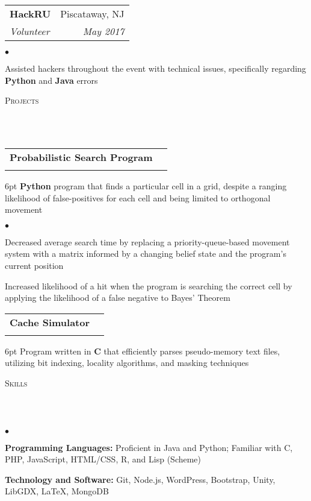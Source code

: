 \documentclass[12pt]{article}
\makeatletter
\newcommand{\lineunder}{
	\vspace*{-8pt} \\ 
	\hspace*{-18pt} 
	\hrulefill \\
}
\newcommand{\header}[1]{
	\vspace*{2pt}
	{\hspace*{-14pt}\vspace*{6pt} \textsc{#1}} 
	\vspace*{-6pt} 
	\lineunder
}
\newenvironment{achievements}{
  \begin{list}{$\bullet$}{
  	\topsep 0pt \itemsep -4pt}}
  	{\vspace*{2pt}\end{list}
}
\newcommand{\subheading}[4]{
 	\vspace{5pt}
    	\begin{tabular*}{1.01\textwidth}{l@{\extracolsep{\fill}}r}
      		\textbf{#1} & #2 \\
      		\textit{\small#3} & \textit{\small #4} \\
    	\end{tabular*}\vspace{-5pt}
}
\makeatother
\begin{document}
\subheading
	{HackRU}{Piscataway, NJ}
	{Volunteer}{May 2017}
	\begin{achievements}
		\item Assisted hackers throughout the event with technical issues, specifically regarding \textbf{Python} and \textbf{Java} errors
	\end{achievements}


\header{Projects}

\subheading{Probabilistic Search Program}{}{}{}
	\vspace{-15pt}	
	\begin{adjustwidth}{6pt}{}
	\textbf{Python} program that finds a particular cell in a grid, despite a ranging likelihood of false-positives for each cell and being limited to orthogonal movement
	\end{adjustwidth}
	\begin{achievements}
		\item Decreased average search time by replacing a priority-queue-based movement system with a matrix informed by a changing belief state and the program's current position
		\item Increased likelihood of a hit when the program is searching the correct cell by applying the likelihood of a false negative to Bayes' Theorem
	\end{achievements}
\subheading{Cache Simulator}{}{}{}
	\vspace{-15pt}
	\begin{adjustwidth}{6pt}{}
	Program written in \textbf{C} that efficiently parses pseudo-memory text files, utilizing bit indexing, locality algorithms, and masking techniques
	\end{adjustwidth}
\vspace*{4pt}
	
\header{Skills}
	\begin{achievements}
		\item{\bf Programming Languages:} Proficient in Java and Python; Familiar with C, PHP, JavaScript, HTML/CSS, R, and Lisp (Scheme)
		\item{\bf Technology and Software:} Git, Node.js, WordPress, Bootstrap, Unity, LibGDX, \LaTeX, MongoDB
	\end{achievements}
\end{document}
